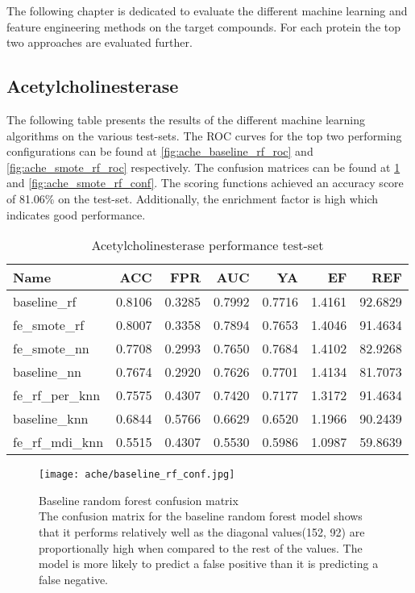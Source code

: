 \label{cha:performance_protein}
The following chapter is dedicated to evaluate the different machine learning and feature engineering methods on
the target compounds. For each protein the top two approaches are evaluated further.

\subsection{Acetylcholinesterase}
The following table presents the results of the different machine learning algorithms on the various
test-sets. The ROC curves for the top two performing configurations can be found at \ref{fig:ache_baseline_rf_roc} and \ref{fig:ache_smote_rf_roc}
respectively. The confusion matrices can be found at \ref{fig:ache_baseline_rf_conf} and \ref{fig:ache_smote_rf_conf}.
The scoring functions achieved an accuracy score of 81.06\% on the test-set. Additionally, the enrichment factor is high which indicates good performance.
\begin{table}[H]
    \begin{center}
        \caption{Acetylcholinesterase performance test-set}
        \begin{tabular}{lrrrrrr}
            \toprule
            Name             & ACC    & FPR    & AUC    & YA     & EF     & REF     \\
            \midrule
            baseline\_rf     & 0.8106 & 0.3285 & 0.7992 & 0.7716 & 1.4161 & 92.6829 \\
            fe\_smote\_rf    & 0.8007 & 0.3358 & 0.7894 & 0.7653 & 1.4046 & 91.4634 \\
            fe\_smote\_nn    & 0.7708 & 0.2993 & 0.7650 & 0.7684 & 1.4102 & 82.9268 \\
            baseline\_nn     & 0.7674 & 0.2920 & 0.7626 & 0.7701 & 1.4134 & 81.7073 \\
            fe\_rf\_per\_knn & 0.7575 & 0.4307 & 0.7420 & 0.7177 & 1.3172 & 91.4634 \\
            baseline\_knn    & 0.6844 & 0.5766 & 0.6629 & 0.6520 & 1.1966 & 90.2439 \\
            fe\_rf\_mdi\_knn & 0.5515 & 0.4307 & 0.5530 & 0.5986 & 1.0987 & 59.8639 \\
            \bottomrule
        \end{tabular}
    \end{center}
\end{table}

\begin{figure}[H]
    \begin{center}
        \captionsetup{justification=centering}
        \texttt{[image: ache/baseline\_rf\_conf.jpg]}
        \caption[]{Baseline random forest confusion matrix\\The confusion matrix for the baseline random forest model shows that it performs relatively well as the diagonal values(152, 92) are proportionally high
            when compared to the rest of the values. The model is more likely to predict a false positive than it is predicting a false negative.}
        \label{fig:ache_baseline_rf_conf}
    \end{center}
\end{figure}


